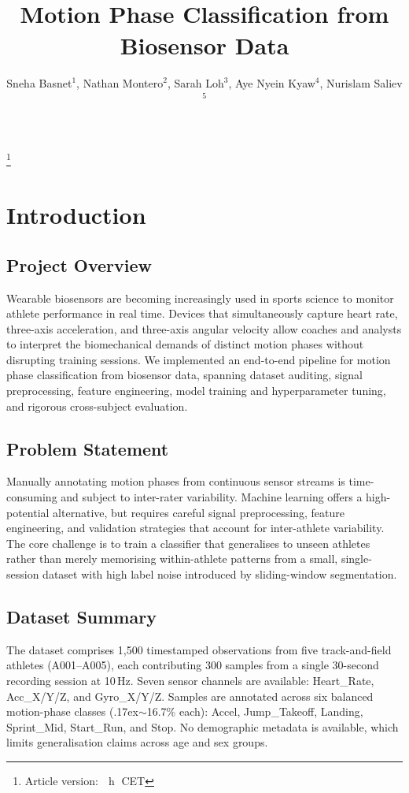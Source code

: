 \documentclass[12pt,a4paper]{cibb}
\title{\Large $\ $\\ \bf Motion Phase Classification from Biosensor Data}
\author{\blue \large Sneha Basnet$^1$, Nathan Montero$^2$, Sarah Loh$^3$, Aye Nyein Kyaw$^4$, Nurislam Saliev$^5$}
\newcommand\blfootnote[1]{%
  \begingroup
  \renewcommand\thefootnote{}\footnote{#1}%
  \addtocounter{footnote}{-1}%
  \endgroup
}
\begin{document}
\blfootnote{\small Article version: \datedate $\;$ h\currenttime $\;$ CET}

\thispagestyle{myheadings}
\pagestyle{myheadings}

\section{Introduction}
\label{sec:introduction}

\subsection{Project Overview}
Wearable biosensors are becoming increasingly used in sports science to monitor athlete performance in real time. Devices that simultaneously capture heart rate, three-axis acceleration, and three-axis angular velocity allow coaches and analysts to interpret the biomechanical demands of distinct motion phases without disrupting training sessions. We implemented an end-to-end pipeline for motion phase classification from biosensor data, spanning dataset auditing, signal preprocessing, feature engineering, model training and hyperparameter tuning, and rigorous cross-subject evaluation.

\subsection{Problem Statement}
Manually annotating motion phases from continuous sensor streams is time-consuming and subject to inter-rater variability. Machine learning offers a high-potential alternative, but requires careful signal preprocessing, feature engineering, and validation strategies that account for inter-athlete variability. The core challenge is to train a classifier that generalises to unseen athletes rather than merely memorising within-athlete patterns from a small, single-session dataset with high label noise introduced by sliding-window segmentation.

\subsection{Dataset Summary}
The dataset comprises 1{,}500 timestamped observations from five track-and-field athletes (A001--A005), each contributing 300 samples from a single 30-second recording session at 10\,Hz. Seven sensor channels are available: Heart\_Rate, Acc\_X/Y/Z, and Gyro\_X/Y/Z. Samples are annotated across six balanced motion-phase classes ({\raise.17ex\hbox{$\scriptstyle\sim$}}16.7\% each): Accel, Jump\_Takeoff, Landing, Sprint\_Mid, Start\_Run, and Stop. No demographic metadata is available, which limits generalisation claims across age and sex groups.
\end{document}

